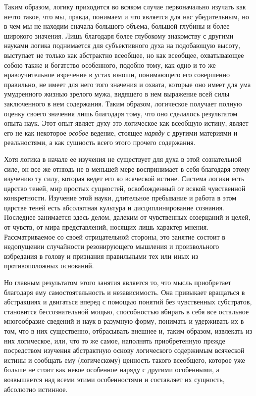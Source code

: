 Таким образом, логику приходится во всяком случае первоначально изучать как
нечто такое, что мы, правда, понимаем и что является для нас убедительным,
но в чем мы не находим сначала большого объема, большой глубины и более
широкого значения. Лишь благодаря более глубокому знакомству с другими
науками логика поднимается для субъективного духа на подобающую высоту,
выступает не только как абстрактно всеобщее, но как всеобщее, охватывающее
собою также и богатство особенного, подобно тому, как одно и то же
нравоучительное изречение в устах юноши, понимающего его совершенно
правильно, не имеет для него того значения и охвата, которые оно имеет для
ума умудренного жизнью зрелого мужа, видящего в нем выражение всей силы
заключенного в нем содержания. Таким образом, логическое получает полную
оценку своего значения лишь благодаря тому, что оно сделалось результатом
опыта наук. Этот опыт являет духу это логическое как всеобщую истину,
являет его не как некоторое {\em особое} ведение,
стоящее {\em наряду} с другими материями и
реальностями, а как сущность всего этого прочего содержания.

Хотя логика в начале ее изучения не существует для духа в этой сознательной
силе, он все же отнюдь не в меньшей мере воспринимает в себя благодаря
этому изучению ту силу, которая ведет его ко всяческой истине. Система
логики есть царство теней, мир простых сущностей, освобожденный от всякой
чувственной конкретности. Изучение этой науки, длительное пребывание и
работа в этом царстве теней есть абсолютная культура и дисциплинирование
сознания. Последнее занимается здесь делом, далеким от чувственных
созерцаний и целей, от чувств, от мира представлений, носящих лишь характер
мнения. Рассматриваемое со своей отрицательной стороны, это занятие состоит
в недопущении случайности резонирующего мышления и произвольного
взбредания в голову и признания правильными тех или иных из
противоположных оснований.

Но главным результатом этого занятия является то, что мысль приобретает
благодаря ему самостоятельность и независимость. Она привыкает вращаться в
абстракциях и двигаться вперед с помощью понятий без чувственных
субстратов, становится бессознательной мощью, способностью вбирать в себя
все остальное многообразие сведений и наук в разумную форму, понимать и
удерживать их в том, что в них существенно, отбрасывать внешнее и, таким
образом, извлекать из них логическое, или, что то же самое, наполнять
приобретенную прежде посредством изучения абстрактную основу логического
содержимым всяческой истины и сообщать ему (логическому) ценность такого
всеобщего, которое уже больше не стоит как некое особенное наряду с другими
особенными, а возвышается над всеми этими особенностями и составляет их
сущность, абсолютно истинное.

